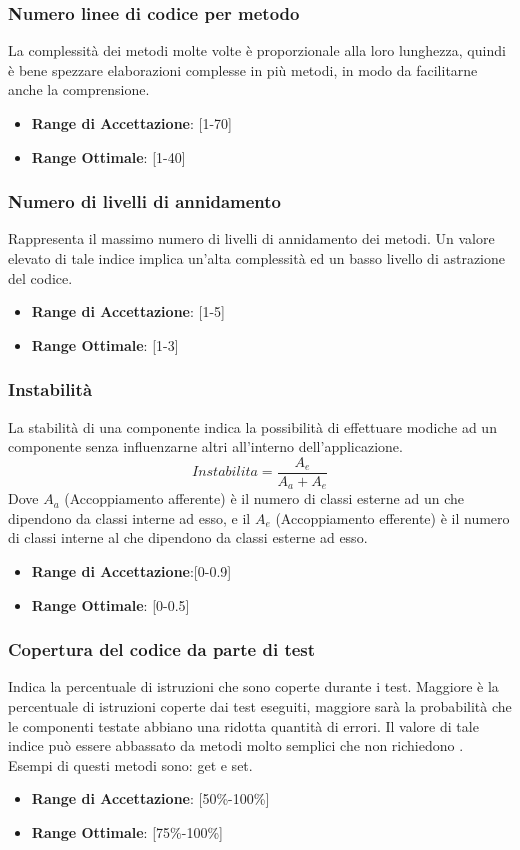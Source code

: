 \documentclass[12pt,a4paper]{article}
\begin{document}
\subsubsection{Numero linee di codice per metodo}
La complessità dei metodi molte volte è proporzionale alla loro lunghezza, quindi è bene spezzare elaborazioni complesse in più metodi, in modo da facilitarne anche la comprensione.
\begin{itemize}
\item \textbf{Range di Accettazione}: [1-70]
\item \textbf{Range Ottimale}: [1-40]
\end{itemize}
\subsubsection{Numero di livelli di annidamento}
Rappresenta il massimo numero di livelli di annidamento dei metodi. Un valore elevato di tale indice implica un'alta complessità ed un basso livello di astrazione del codice.
\begin{itemize}
\item \textbf{Range di Accettazione}: [1-5]
\item \textbf{Range Ottimale}: [1-3]
\end{itemize}
\subsubsection{Instabilità}
La stabilità di una componente indica la possibilità di effettuare modiche ad un componente senza influenzarne altri all'interno dell'applicazione.
\[Instabilita=\frac{A_e}{A_a+A_e}\]
Dove $A_a$ (Accoppiamento afferente) è il numero di classi esterne ad un  che dipendono da classi interne ad esso, e il $A_e$ (Accoppiamento efferente) è il numero di classi interne al  che dipendono da classi esterne ad esso.
\begin{itemize}
\item \textbf{Range di Accettazione}:[0-0.9]
\item \textbf{Range Ottimale}: [0-0.5]
\end{itemize}
\subsubsection{Copertura del codice da parte di test}
Indica la percentuale di istruzioni che sono coperte durante i test. Maggiore è la percentuale di istruzioni coperte dai test eseguiti, maggiore sarà la probabilità che le componenti testate abbiano una ridotta quantità di errori. Il valore di tale indice può essere abbassato da metodi molto semplici che non richiedono . Esempi di questi metodi sono: get e set.
\begin{itemize}
\item \textbf{Range di Accettazione}: [50\%-100\%]
\item \textbf{Range Ottimale}: [75\%-100\%]
\end{itemize}
\end{document}

